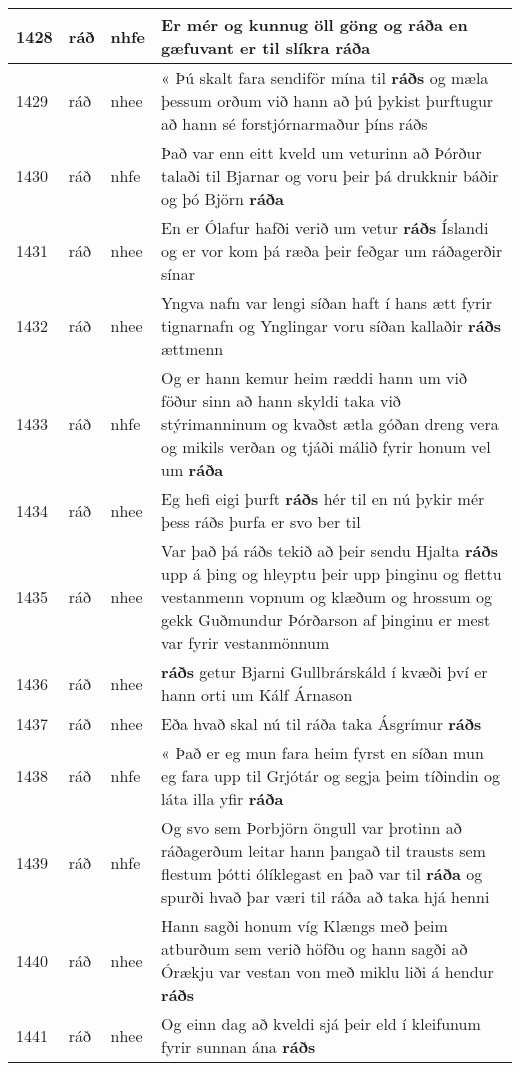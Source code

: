 \documentclass{article}
\begin{document}
\begin{longtable}{p{1cm}|p{1cm}|p{1cm}|p{13cm}}
\hline
1428&ráð&nhfe&Er mér og kunnug öll göng og \textbf{ráða} en gæfuvant er til slíkra ráða\\
\hline
1429&ráð&nhee&« Þú skalt fara sendiför mína til \textbf{ráðs} og mæla þessum orðum við hann að þú þykist þurftugur að hann sé forstjórnarmaður þíns ráðs\\
\hline
1430&ráð&nhfe&Það var enn eitt kveld um veturinn að Þórður talaði til Bjarnar og voru þeir þá drukknir báðir og þó Björn \textbf{ráða} \\
\hline
1431&ráð&nhee&En er Ólafur hafði verið um vetur \textbf{ráðs} Íslandi og er vor kom þá ræða þeir feðgar um ráðagerðir sínar\\
\hline
1432&ráð&nhee&Yngva nafn var lengi síðan haft í hans ætt fyrir tignarnafn og Ynglingar voru síðan kallaðir \textbf{ráðs} ættmenn\\
\hline
1433&ráð&nhfe&Og er hann kemur heim ræddi hann um við föður sinn að hann skyldi taka við stýrimanninum og kvaðst ætla góðan dreng vera og mikils verðan og tjáði málið fyrir honum vel um \textbf{ráða} \\
\hline
1434&ráð&nhee&Eg hefi eigi þurft \textbf{ráðs} hér til en nú þykir mér þess ráðs þurfa er svo ber til\\
\hline
1435&ráð&nhee&Var það þá ráðs tekið að þeir sendu Hjalta \textbf{ráðs} upp á þing og hleyptu þeir upp þinginu og flettu vestanmenn vopnum og klæðum og hrossum og gekk Guðmundur Þórðarson af þinginu er mest var fyrir vestanmönnum\\
\hline
1436&ráð&nhee& \textbf{ráðs} getur Bjarni Gullbrárskáld í kvæði því er hann orti um Kálf Árnason\\
\hline
1437&ráð&nhee&Eða hvað skal nú til ráða taka Ásgrímur \textbf{ráðs} \\
\hline
1438&ráð&nhfe&« Það er eg mun fara heim fyrst en síðan mun eg fara upp til Grjótár og segja þeim tíðindin og láta illa yfir \textbf{ráða} \\
\hline
1439&ráð&nhfe&Og svo sem Þorbjörn öngull var þrotinn að ráðagerðum leitar hann þangað til trausts sem flestum þótti ólíklegast en það var til \textbf{ráða} og spurði hvað þar væri til ráða að taka hjá henni\\
\hline
1440&ráð&nhee&Hann sagði honum víg Klængs með þeim atburðum sem verið höfðu og hann sagði að Órækju var vestan von með miklu liði á hendur \textbf{ráðs} \\
\hline
1441&ráð&nhee&Og einn dag að kveldi sjá þeir eld í kleifunum fyrir sunnan ána \textbf{ráðs} \\

\end{longtable}
\end{document}
